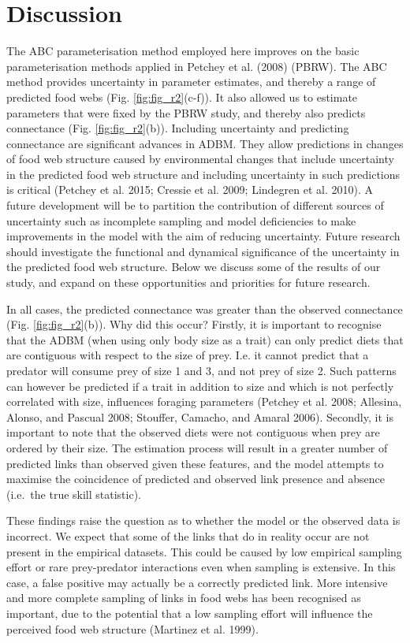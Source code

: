 \documentclass{article}
\begin{document}
\hypertarget{discussion}{%
\section{Discussion}\label{discussion}}

The ABC parameterisation method employed here improves on the basic
parameterisation methods applied in Petchey et al. (2008) (PBRW). The
ABC method provides uncertainty in parameter estimates, and thereby a
range of predicted food webs (Fig. \ref{fig:fig_r2}(c-f)). It also
allowed us to estimate parameters that were fixed by the PBRW study, and
thereby also predicts connectance (Fig. \ref{fig:fig_r2}(b)). Including
uncertainty and predicting connectance are significant advances in ADBM.
They allow predictions in changes of food web structure caused by
environmental changes that include uncertainty in the predicted food web
structure and including uncertainty in such predictions is critical
(Petchey et al. 2015; Cressie et al. 2009; Lindegren et al. 2010). A
future development will be to partition the contribution of different
sources of uncertainty such as incomplete sampling and model
deficiencies to make improvements in the model with the aim of reducing
uncertainty. Future research should investigate the functional and
dynamical significance of the uncertainty in the predicted food web
structure. Below we discuss some of the results of our study, and expand
on these opportunities and priorities for future research.

In all cases, the predicted connectance was greater than the observed
connectance (Fig. \ref{fig:fig_r2}(b)). Why did this occur? Firstly, it
is important to recognise that the ADBM (when using only body size as a
trait) can only predict diets that are contiguous with respect to the
size of prey. I.e. it cannot predict that a predator will consume prey
of size 1 and 3, and not prey of size 2. Such patterns can however be
predicted if a trait in addition to size and which is not perfectly
correlated with size, influences foraging parameters (Petchey et al.
2008; Allesina, Alonso, and Pascual 2008; Stouffer, Camacho, and Amaral
2006). Secondly, it is important to note that the observed diets were
not contiguous when prey are ordered by their size. The estimation
process will result in a greater number of predicted links than observed
given these features, and the model attempts to maximise the coincidence
of predicted and observed link presence and absence (i.e.~the true skill
statistic).

These findings raise the question as to whether the model or the
observed data is incorrect. We expect that some of the links that do in
reality occur are not present in the empirical datasets. This could be
caused by low empirical sampling effort or rare prey-predator
interactions even when sampling is extensive. In this case, a false
positive may actually be a correctly predicted link. More intensive and
more complete sampling of links in food webs has been recognised as
important, due to the potential that a low sampling effort will
influence the perceived food web structure (Martinez et al. 1999).
\end{document}

